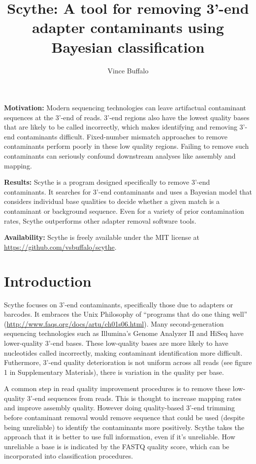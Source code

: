 \documentclass[11pt]{article}
\title{Scythe: A tool for removing 3'-end adapter contaminants using Bayesian classification}
\author{Vince Buffalo}
\date{}
\begin{document}
\maketitle

\setcounter{tocdepth}{3}
\tableofcontents
\vspace*{1cm}


\textbf{Motivation:} Modern sequencing technologies can leave artifactual
 contaminant sequences at the 3'-end of reads. 3'-end regions also
 have the lowest quality bases that are likely to be called
 incorrectly, which makes identifying and removing 3'-end contaminants
 difficult. Fixed-number mismatch approaches to remove contaminants
 perform poorly in these low quality regions. Failing to remove such
 contaminants can seriously confound downstream analyses like assembly
 and mapping.


\textbf{Results:} Scythe is a program designed specifically to remove 3'-end
 contaminants. It searches for 3'-end contaminants and uses a Bayesian
 model that considers individual base qualities to decide whether a
 given match is a contaminant or background sequence. Even for a
 variety of prior contamination rates, Scythe outperforms other
 adapter removal software tools.

\textbf{Availability:} Scythe is freely available under the MIT license at
 \href{https://github.com/vsbuffalo/scythe}{https://github.com/vsbuffalo/scythe}.

\section{Introduction}
\label{sec-1}


Scythe focuses on 3'-end contaminants, specifically those due to
adapters or barcodes. It embraces the Unix Philosophy of ``programs
that do one thing well''
(\href{http://www.faqs.org/docs/artu/ch01s06.html}{http://www.faqs.org/docs/artu/ch01s06.html}). Many second-generation
sequencing technologies such as Illumina's Genome Analyzer II and
HiSeq have lower-quality 3'-end bases. These low-quality bases are
more likely to have nucleotides called incorrectly, making contaminant
identification more difficult. Futhermore, 3'-end quality
deterioration is not uniform across all reads (see figure 1 in
Supplementary Materials), there is variation in the quality per base.

A common step in read quality improvement procedures is to remove
these low-quality 3'-end sequences from reads. This is thought to
increase mapping rates and improve assembly quality. However doing
quality-based 3'-end trimming before contaminant removal would remove
sequence that could be used (despite being unreliable) to identify the
contaminants more positively. Scythe takes the approach that it is
better to use full information, even if it's unreliable. How
unreliable a base is is indicated by the FASTQ quality score, which
can be incorporated into classification procedures.
\end{document}
